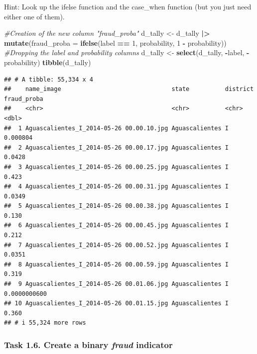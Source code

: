 \documentclass[
]{article}
\newenvironment{Shaded}{\begin{snugshade}}{\end{snugshade}}
\newcommand{\AttributeTok}[1]{\textcolor[rgb]{0.13,0.29,0.53}{#1}}
\newcommand{\CommentTok}[1]{\textcolor[rgb]{0.56,0.35,0.01}{\textit{#1}}}
\newcommand{\DecValTok}[1]{\textcolor[rgb]{0.00,0.00,0.81}{#1}}
\newcommand{\FunctionTok}[1]{\textcolor[rgb]{0.13,0.29,0.53}{\textbf{#1}}}
\newcommand{\NormalTok}[1]{#1}
\newcommand{\OtherTok}[1]{\textcolor[rgb]{0.56,0.35,0.01}{#1}}
\newcommand{\SpecialCharTok}[1]{\textcolor[rgb]{0.81,0.36,0.00}{\textbf{#1}}}
\begin{document}
Hint: Look up the ifelse function and the case\_when function (but you
just need either one of them).

\begin{Shaded}
\begin{Highlighting}[]
\CommentTok{\#Creation of the new column "fraud\_proba"}
\NormalTok{d\_tally }\OtherTok{\textless{}{-}}\NormalTok{ d\_tally }\SpecialCharTok{|\textgreater{}}
  \FunctionTok{mutate}\NormalTok{(}\AttributeTok{fraud\_proba =} \FunctionTok{ifelse}\NormalTok{(label }\SpecialCharTok{==} \DecValTok{1}\NormalTok{, probability, }\DecValTok{1} \SpecialCharTok{{-}}\NormalTok{ probability))}
\CommentTok{\#Dropping the label and probability columns}
\NormalTok{d\_tally }\OtherTok{\textless{}{-}} \FunctionTok{select}\NormalTok{(d\_tally, }\SpecialCharTok{{-}}\NormalTok{label, }\SpecialCharTok{{-}}\NormalTok{probability)}
\FunctionTok{tibble}\NormalTok{(d\_tally)}
\end{Highlighting}
\end{Shaded}

\begin{verbatim}
## # A tibble: 55,334 x 4
##    name_image                               state          district  fraud_proba
##    <chr>                                    <chr>          <chr>           <dbl>
##  1 Aguascalientes_I_2014-05-26 00.00.10.jpg Aguascalientes I        0.000804    
##  2 Aguascalientes_I_2014-05-26 00.00.17.jpg Aguascalientes I        0.0428      
##  3 Aguascalientes_I_2014-05-26 00.00.25.jpg Aguascalientes I        0.423       
##  4 Aguascalientes_I_2014-05-26 00.00.31.jpg Aguascalientes I        0.0349      
##  5 Aguascalientes_I_2014-05-26 00.00.38.jpg Aguascalientes I        0.130       
##  6 Aguascalientes_I_2014-05-26 00.00.45.jpg Aguascalientes I        0.212       
##  7 Aguascalientes_I_2014-05-26 00.00.52.jpg Aguascalientes I        0.0351      
##  8 Aguascalientes_I_2014-05-26 00.00.59.jpg Aguascalientes I        0.319       
##  9 Aguascalientes_I_2014-05-26 00.01.06.jpg Aguascalientes I        0.0000000600
## 10 Aguascalientes_I_2014-05-26 00.01.15.jpg Aguascalientes I        0.360       
## # i 55,324 more rows
\end{verbatim}

\clearpage

\hypertarget{task-1.6.-create-a-binary-fraud-indicator}{%
\subsubsection{\texorpdfstring{Task 1.6. Create a binary \emph{fraud}
indicator}{Task 1.6. Create a binary fraud indicator}}\label{task-1.6.-create-a-binary-fraud-indicator}}
\end{document}

